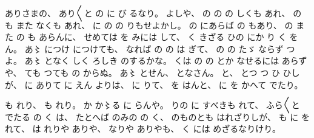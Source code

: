 ありさまの、
%
あり〳〵と
の
に%
び
るなり。
%
よしや、
%
の
の
の
しくも
あれ、
%
の
も
また
なくも
あれ、
%
に
の
の
りもせよかし。
%
の
にあらば
の
もあり、
%
の
また
の
も
あらんに、
%
せめては
を
%
みには
して、
%
く
きざる
ひの
にか
り
く
を
ん。
%
あ〻%
につけ
につけても、
%
なれば
の
の
は
ぎて、
%
の
の
たゞ%
ならず
つ
よ。
%
あ〻%
となく
しく
ろしき
のするかな。
%
くは
の
の
とか
なせるには
あらずや、
%
ても
つても
の%
からぬ。
%
あ〻%
とせん、
%
となさん。
%
と、
%
とつ
つ
ひ
ひしが、
%
に%
ありて
に
えん
よりは、
%
に
りて、
%
を
はんと、%
%
に
を
かへて
でたり。

%
も
れり、
%
も
れり。
%
か
か〻る%
に
らんや。
%
りの
に
すべきも
れて、
%
ふら〳〵と
でたる
の
く
は、
%
たとへば
のみの
の
く、
%
のものとも
はれざりしが、
%
も
に
を
れて、
%
は
れりや
ありや、
%
なりや
ありやも、
%
く
には%
めざるなりけり。
